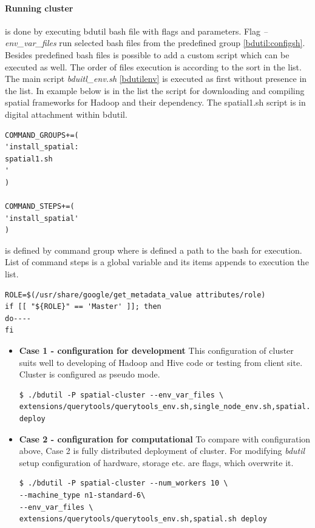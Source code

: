 \documentclass[a4paper,12pt,oneside]{report}
\begin{document}
    \paragraph{Running cluster}\label{runcluster} is done by executing bdutil bash
    file with flags and parameters.  Flag \textit{--env\_var\_files} run selected bash files from the 
    predefined    group \ref{bdutil:configsh}. Besides predefined bash files is possible to add a custom
    script which can be    executed as well. The  order of files execution is according to the sort in the list. 
    The main script    \textit{bduitl\_env.sh} \ref{bdutilenv} is executed as first without presence 
    in the list. In example below is in the list the script for downloading and compiling spatial frameworks for 
    Hadoop and their dependency. The spatial1.sh script is in digital attachment within bdutil.
	\begin{footnotesize}
		\begin{lstlisting}[style=python]
COMMAND_GROUPS+=(
'install_spatial:
spatial1.sh
'
)

COMMAND_STEPS+=(
'install_spatial'
)
		\end{lstlisting}
	\end{footnotesize}
	is defined by command group where is defined a path to the bash for execution.
	List of command steps is a global variable and its items appends to execution the list.
	\begin{footnotesize}
		\begin{lstlisting}[style=python]
ROLE=$(/usr/share/google/get_metadata_value attributes/role)
if [[ "${ROLE}" == 'Master' ]]; then 
do----
fi
		\end{lstlisting}
	\end{footnotesize}
	\begin{itemize}
		\item \textbf{Case 1 - configuration for development }  This configuration of cluster
		suits well to developing  of Hadoop and Hive code or testing from client site. 
		Cluster is configured as pseudo mode.
		\begin{footnotesize}
			\begin{lstlisting}[style=python]
$ ./bdutil -P spatial-cluster --env_var_files \
extensions/querytools/querytools_env.sh,single_node_env.sh,spatial.sh deploy
			\end{lstlisting}
		\end{footnotesize}
		
		
		\item \textbf{Case 2 - configuration for computational }  To compare with configuration
		above, Case 2 is fully 	distributed deployment of cluster. For modifying  \textit{bdutil} setup configuration
		of hardware, storage etc. are flags, which overwrite it.
		\begin{footnotesize}
\begin{lstlisting}[style=python]
$ ./bdutil -P spatial-cluster --num_workers 10 \
--machine_type n1-standard-6\
--env_var_files \
extensions/querytools/querytools_env.sh,spatial.sh deploy
			\end{lstlisting}
		\end{footnotesize}
	\end{itemize}
	
\end{document}
